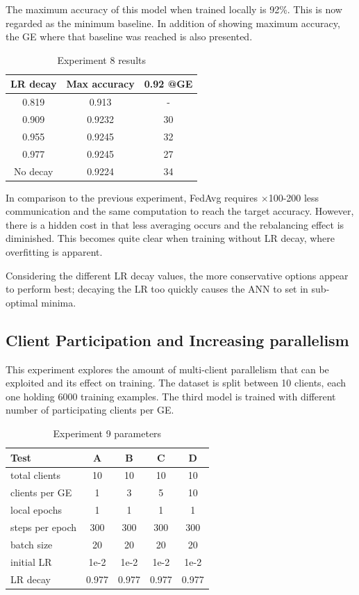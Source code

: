 The maximum accuracy of this model when trained locally is 92\%. This is now regarded as the minimum baseline. In addition of showing maximum accuracy, the GE where that baseline was reached is also presented.

\begin{table}[H]
    \center
    \begin{tabular}
        { | c | c | c | }
        \hline
        LR decay & Max accuracy & 0.92 @GE\\\hline
        0.819 & 0.913 & -\\\hline
        0.909 & 0.9232 & 30\\\hline
        0.955 & 0.9245 & 32\\\hline
        0.977 & 0.9245 & 27\\\hline
        No decay & 0.9224 & 34\\\hline
    \end{tabular}
    \caption[Experiment 8 results]{Experiment 8 results}
    \label{table:Experiment 8 results}
\end{table}

In comparison to the previous experiment, FedAvg requires \(\times\)100-200 less communication and the same computation to reach the target accuracy. However, there is a hidden cost in that less averaging occurs and the rebalancing effect is diminished. This becomes quite clear when training without LR decay, where overfitting is apparent.

Considering the different LR decay values, the more conservative options appear to perform best; decaying the LR too quickly causes the ANN to set in sub-optimal minima.

\subsection{Client Participation and Increasing parallelism}
This experiment explores the amount of multi-client parallelism that can be exploited and its effect on training. The dataset is split between 10 clients, each one holding 6000 training examples. The third model is trained with different number of participating clients per GE. 
    
\begin{table}[H]
    \center
    \begin{tabular}{ | l | c | c | c | c | }
        \hline
        Test & A & B & C & D\\\hline
        total clients   & 10 & 10 & 10 & 10\\\hline
        clients per GE  & 1 & 3 & 5 & 10\\\hline
        local epochs    & 1 & 1 & 1 & 1\\\hline
        steps per epoch & 300 & 300 & 300 & 300\\\hline
        batch size      & 20 & 20 & 20 & 20\\\hline
        initial LR      & 1e-2 & 1e-2 & 1e-2 & 1e-2\\\hline
        LR decay        & 0.977 & 0.977 & 0.977 & 0.977\\\hline
    \end{tabular}
    \caption[Experiment 9 parameters]{Experiment 9 parameters}
\end{table}

